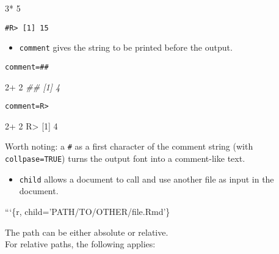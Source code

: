 \documentclass[]{book}
\newenvironment{Shaded}{}{}
\newcommand{\BaseNTok}[1]{\textcolor[rgb]{0.25,0.63,0.44}{#1}}
\newcommand{\CommentTok}[1]{\textcolor[rgb]{0.38,0.63,0.69}{\textit{#1}}}
\newcommand{\DecValTok}[1]{\textcolor[rgb]{0.25,0.63,0.44}{#1}}
\newcommand{\NormalTok}[1]{#1}
\newcommand{\OperatorTok}[1]{\textcolor[rgb]{0.40,0.40,0.40}{#1}}
\newcommand{\StringTok}[1]{\textcolor[rgb]{0.25,0.44,0.63}{#1}}
\providecommand{\tightlist}{%
  \setlength{\itemsep}{0pt}\setlength{\parskip}{0pt}}
\theoremstyle{definition}
\theoremstyle{definition}
\theoremstyle{definition}
\theoremstyle{remark}
\begin{document}
\begin{Shaded}
\begin{Highlighting}[]
\DecValTok{3}\OperatorTok{*}\StringTok{ }\DecValTok{5}
\end{Highlighting}
\end{Shaded}

\begin{verbatim}
#R> [1] 15
\end{verbatim}

\begin{itemize}
\tightlist
\item
  \texttt{comment} gives the string to be printed before the output.
\end{itemize}

\texttt{comment=\textquotesingle{}\#\#\textquotesingle{}}

\begin{Shaded}
\begin{Highlighting}[]
\DecValTok{2}\OperatorTok{+}\StringTok{ }\DecValTok{2}
\CommentTok{## [1] 4}
\end{Highlighting}
\end{Shaded}

\texttt{comment=\textquotesingle{}R\textgreater{}\textquotesingle{}}

\begin{Shaded}
\begin{Highlighting}[]
\DecValTok{2}\OperatorTok{+}\StringTok{ }\DecValTok{2}
\NormalTok{R}\OperatorTok{>}\StringTok{ }\NormalTok{[}\DecValTok{1}\NormalTok{] }\DecValTok{4}
\end{Highlighting}
\end{Shaded}

Worth noting: a \texttt{\#} as a first character of the comment string
(with \texttt{collpase=TRUE}) turns the output font into a comment-like
text.

\begin{itemize}
\tightlist
\item
  \texttt{child} allows a document to call and use another file as input
  in the document.
\end{itemize}

\begin{Shaded}
\begin{Highlighting}[]
\BaseNTok{```\{r, child='PATH/TO/OTHER/file.Rmd'\}}
\end{Highlighting}
\end{Shaded}

The path can be either absolute or relative.\\
For relative paths, the following applies:
\end{document}
